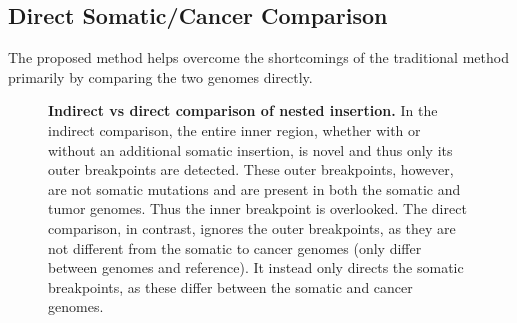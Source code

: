 \documentclass{easychithesis}
\begin{document}
\subsection{Direct Somatic/Cancer Comparison}
The proposed method helps overcome the shortcomings of the traditional method primarily by comparing the two genomes directly. 

\begin{figure}[ht]
\centering
{}
\quad
{}
%
\caption{{\bf Indirect vs direct comparison of nested insertion.} In the indirect comparison, the entire inner region, whether with or without an additional somatic insertion, is novel and thus only its outer breakpoints are detected. These outer breakpoints, however, are not somatic mutations and are present in both the somatic and tumor genomes. Thus the inner breakpoint is overlooked. The direct comparison, in contrast, ignores the outer breakpoints, as they are not different from the somatic to cancer genomes (only differ between genomes and reference). It instead only directs the somatic breakpoints, as these differ between the somatic and cancer genomes.}
\label{fig:NestedInsertion}
\end{figure}
\end{document}
